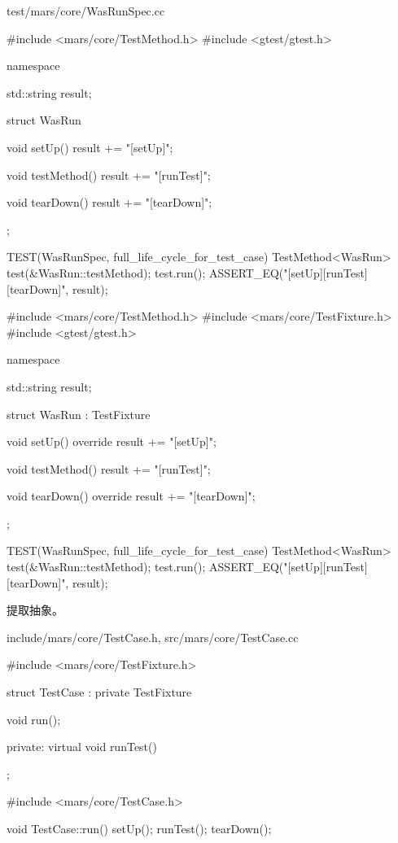 \begin{content}
\begin{diff}{test/mars/core/WasRunSpec.cc}
\begin{minicpp}
#include <mars/core/TestMethod.h>
#include <gtest/gtest.h>

namespace {
  std::string result;

  struct WasRun {
    void setUp() {
      result += "[setUp]";
    }

    void testMethod() {
      result += "[runTest]";
    }

    void tearDown() {
      result += "[tearDown]";
    }
  };
}

TEST(WasRunSpec, full_life_cycle_for_test_case) {
  TestMethod<WasRun> test(&WasRun::testMethod);
  test.run();
  ASSERT_EQ("[setUp][runTest][tearDown]", result);
}
\end{minicpp}
\tcblower
\begin{minicpp}
#include <mars/core/TestMethod.h>
#include <mars/core/TestFixture.h>
#include <gtest/gtest.h>

namespace {
  std::string result;

  struct WasRun : TestFixture {
    void setUp() override {
      result += "[setUp]";
    }

    void testMethod() {
      result += "[runTest]";
    }

    void tearDown() override {
      result += "[tearDown]";
    }
  };
}

TEST(WasRunSpec, full_life_cycle_for_test_case) {
  TestMethod<WasRun> test(&WasRun::testMethod);
  test.run();
  ASSERT_EQ("[setUp][runTest][tearDown]", result);
}
\end{minicpp}
\end{diff}

提取抽象。

\begin{diff}{include/mars/core/TestCase.h, src/mars/core/TestCase.cc}
\begin{minicpp}
#include <mars/core/TestFixture.h>

struct TestCase : private TestFixture {
  void run();

private:
  virtual void runTest() {}
};
\end{minicpp}
\tcblower
\begin{minicpp}
#include <mars/core/TestCase.h>

void TestCase::run() {
  setUp();
  runTest();
  tearDown();
}
\end{minicpp}
\end{diff}


\end{content}
